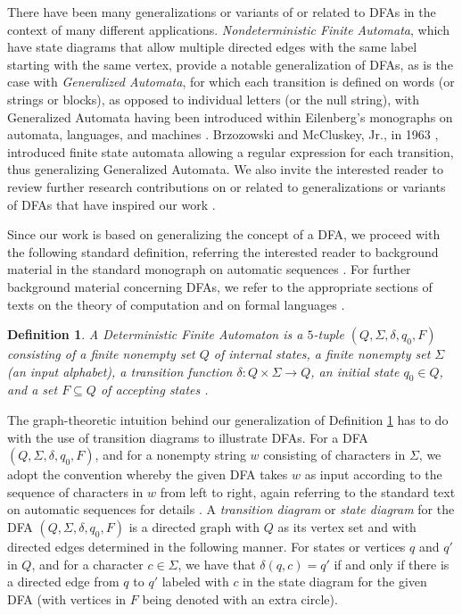 \documentclass[12pt]{article}
\newtheorem{definition}{Definition}
\begin{document}
 There have been many generalizations or variants of or related to DFAs in the context of many different applications. 
 \emph{Nondeterministic Finite Automata}, which have state diagrams that allow multiple directed edges with the same label starting 
 with the same vertex, provide a notable generalization of DFAs, as is the case with \emph{Generalized Automata}, for which each 
 transition is defined on words (or strings or blocks), as opposed to individual letters (or the null string), with Generalized Automata 
 having been introduced within Eilenberg's monographs on automata, languages, and machines \cite{Eilenberg1974}. Brzozowski and 
 McCluskey, Jr., in 1963 \cite{BrzozowskiMcCluskey1963}, introduced finite state automata allowing a regular expression for each 
 transition, thus generalizing Generalized Automata. We also invite the interested reader to review further research contributions on 
 or related to generalizations or variants of DFAs that have inspired our work 
 \cite{GiammarresiMontalbano1999,HanWood2005,Hashigushi1991,Nagy2023}. 

 Since our work is based on generalizing the concept of a DFA, we proceed with the following standard definition, referring the 
 interested reader to background material in the standard monograph on automatic sequences \cite{AlloucheShallit2003}. For further 
 background material concerning DFAs, we refer to the appropriate sections of texts on the theory of computation 
 \cite[\S2.2]{Wood1987} and on formal languages \cite[\S2.21]{RozenbergSalomaa1997}. 

\begin{definition}\label{definitionDFA}
 A \emph{Deterministic Finite Automaton} is a $5$-tuple $(Q, \Sigma, \delta, q_0, F)$ consisting of a finite nonempty set $Q$ of 
 internal \emph{states}, a finite nonempty set $\Sigma$ (an \emph{input alphabet}), a \emph{transition function} $\delta\colon Q 
 \times \Sigma \to Q$, an \emph{initial state} $q_{0} \in Q$, and a set $F \subseteq Q$ of \emph{accepting 
 states} \cite[\S4.1]{AlloucheShallit2003}. 
\end{definition}

 The graph-theoretic intuition behind our generalization of Definition \ref{definitionDFA} has to do with the use of transition diagrams to 
 illustrate DFAs. For a DFA $(Q, \Sigma, \delta, q_0, F)$, and for a nonempty string $w$ consisting of characters in $\Sigma$, we adopt 
 the convention whereby the given DFA takes $w$ as input according to the sequence of characters in $w$ from left to right, again 
 referring to the standard text on automatic sequences for details \cite[\S4.1]{AlloucheShallit2003}. A \emph{transition diagram} or 
 \emph{state diagram} for the DFA $(Q, \Sigma, \delta, q_0, F)$ is a directed graph with $Q$ as its vertex set and with directed edges 
 determined in the following manner. For states or vertices $q$ and $q'$ in $Q$, and for a character $c \in \Sigma$, we have 
 that $\delta(q, c) = q'$ if and only if there is a directed edge from $q$ to $q'$ labeled with $c$ in the state diagram for the 
 given DFA (with vertices in $F$ being denoted with an extra circle). 
\end{document}
